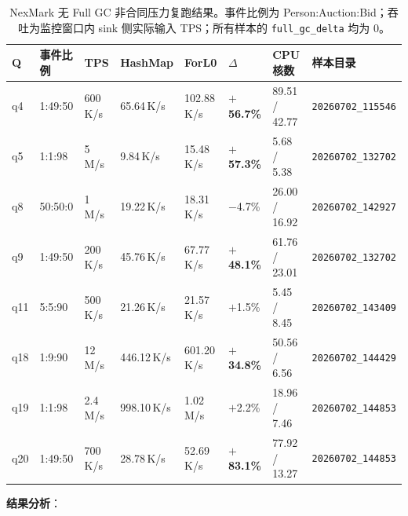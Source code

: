 \documentclass[a4paper,11pt]{article}
\begin{document}
\begin{table}[H]
\centering
\tiny
\begin{tabularx}{\textwidth}{L{0.75cm} L{1.15cm} R{0.9cm} R{1.05cm} R{1.05cm} R{0.95cm} R{1.25cm} X}
\toprule
\textbf{Q} & \textbf{事件比例} & \textbf{TPS} & \textbf{HashMap} & \textbf{ForL0} & $\Delta$ & \textbf{CPU 核数} & \textbf{样本目录} \\
\midrule
q4  & 1:49:50  & 600\,K/s & 65.64\,K/s  & 102.88\,K/s & \textbf{$+$56.7\%} & 89.51 / 42.77 & \texttt{20260702\_115546} \\
q5  & 1:1:98   & 5\,M/s   & 9.84\,K/s   & 15.48\,K/s  & \textbf{$+$57.3\%} & 5.68 / 5.38   & \texttt{20260702\_132702} \\
q8  & 50:50:0  & 1\,M/s   & 19.22\,K/s  & 18.31\,K/s  & $-$4.7\%  & 26.00 / 16.92 & \texttt{20260702\_142927} \\
q9  & 1:49:50  & 200\,K/s & 45.76\,K/s  & 67.77\,K/s  & \textbf{$+$48.1\%} & 61.76 / 23.01 & \texttt{20260702\_132702} \\
q11 & 5:5:90   & 500\,K/s & 21.26\,K/s  & 21.57\,K/s  & $+$1.5\%  & 5.45 / 8.45   & \texttt{20260702\_143409} \\
q18 & 1:9:90   & 12\,M/s  & 446.12\,K/s & 601.20\,K/s & \textbf{$+$34.8\%} & 50.56 / 6.56  & \texttt{20260702\_144429} \\
q19 & 1:1:98   & 2.4\,M/s & 998.10\,K/s & 1.02\,M/s   & $+$2.2\%  & 18.96 / 7.46  & \texttt{20260702\_144853} \\
q20 & 1:49:50  & 700\,K/s & 28.78\,K/s  & 52.69\,K/s  & \textbf{$+$83.1\%} & 77.92 / 13.27 & \texttt{20260702\_144853} \\
\bottomrule
\end{tabularx}
\caption{NexMark 无 Full GC 非合同压力复跑结果。事件比例为 Person:Auction:Bid；吞吐为监控窗口内 sink 侧实际输入 TPS；所有样本的 \texttt{full\_gc\_delta} 均为 0。}
\label{tab:nexmark-no-full-gc}
\end{table}

\textbf{结果分析}：
\end{document}
